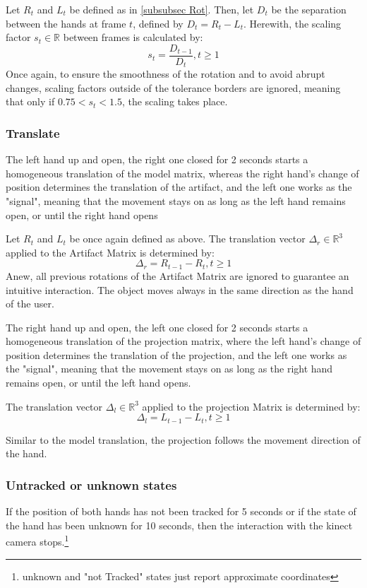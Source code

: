 \documentclass[12pt]{extarticle}
\newcommand{\R}{\mathbb{R}}
\begin{document}
Let $R_t$ and $L_t$ be defined as in \ref{subsubsec Rot}. Then, let $D_t$ be the separation between the hands at frame $t$, defined by $D_t=R_{t}-L_{t}$. Herewith, the scaling factor $s_t\in \R$ between frames is calculated by:
$$s_t=\frac{D_{t-1}}{D_t}, t\geq 1$$
Once again, to ensure the smoothness of the rotation and to avoid abrupt changes, scaling factors outside of the tolerance borders are ignored, meaning that only if $0.75<s_t<1.5$, the scaling takes place.


\subsubsection {Translate} The left hand up and open, the right one closed for 2 seconds starts a homogeneous translation of the model matrix, whereas the right hand's change of position determines the translation of the artifact, and the left one works as the "signal", meaning that the movement stays on as long as the left hand remains open, or until the right hand opens

Let $R_t$ and $L_t$ be once again defined as above. The translation vector $\Delta_r\in \R^3$ applied to the Artifact Matrix is determined by:
$$\Delta_r=R_{t-1}-R_t, t\geq 1$$
Anew, all previous rotations of the Artifact Matrix are ignored to guarantee an intuitive interaction. The object moves always in the same direction as the hand of the user.

The right hand up and open, the left one closed for 2 seconds starts a homogeneous translation of the projection matrix, where the left hand's change of position determines the translation of the projection, and the left one works as the "signal", meaning that the movement stays on as long as the right hand remains open, or until the left hand opens.

The translation vector $\Delta_l\in \R^3$ applied to the projection Matrix is determined by:
$$\Delta_l=L_{t-1}-L_t, t\geq 1$$

Similar to the model translation, the projection follows the movement direction of the hand.
\subsubsection {Untracked or unknown states} If the position of both hands has not been tracked for 5 seconds or if the state of the hand has been unknown for 10 seconds, then the interaction with the kinect camera stops.\footnote{unknown and "not Tracked" states just report approximate coordinates} 
\end{document}
